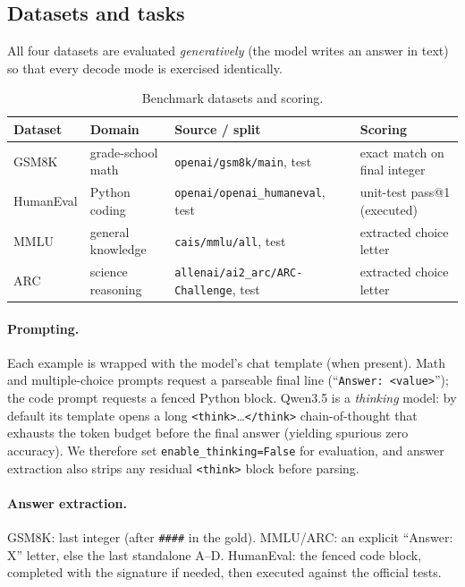 \documentclass[11pt]{article}
\begin{document}
\subsection{Datasets and tasks}
All four datasets are evaluated \emph{generatively} (the model writes an answer
in text) so that every decode mode is exercised identically.

\begin{table}[h]
\centering
\caption{Benchmark datasets and scoring.}
\begin{tabular}{@{}llll@{}}
\toprule
\textbf{Dataset} & \textbf{Domain} & \textbf{Source / split} & \textbf{Scoring} \\
\midrule
GSM8K & grade-school math & \texttt{openai/gsm8k/main}, test & exact match on final integer \\
HumanEval & Python coding & \texttt{openai/openai\_humaneval}, test & unit-test pass@1 (executed) \\
MMLU & general knowledge & \texttt{cais/mmlu/all}, test & extracted choice letter \\
ARC & science reasoning & \texttt{allenai/ai2\_arc/ARC-Challenge}, test & extracted choice letter \\
\bottomrule
\end{tabular}
\end{table}

\paragraph{Prompting.} Each example is wrapped with the model's chat template
(when present). Math and multiple-choice prompts request a parseable final line
(``\texttt{Answer: <value>}''); the code prompt requests a fenced Python block.
Qwen3.5 is a \emph{thinking} model: by default its template opens a long
\texttt{<think>}\dots\texttt{</think>} chain-of-thought that exhausts the token
budget before the final answer (yielding spurious zero accuracy). We therefore
set \texttt{enable\_thinking=False} for evaluation, and answer extraction also
strips any residual \texttt{<think>} block before parsing.

\paragraph{Answer extraction.} GSM8K: last integer (after \texttt{\#\#\#\#} in the
gold). MMLU/ARC: an explicit ``Answer: X'' letter, else the last standalone
A--D. HumanEval: the fenced code block, completed with the signature if needed,
then executed against the official tests.
\end{document}
